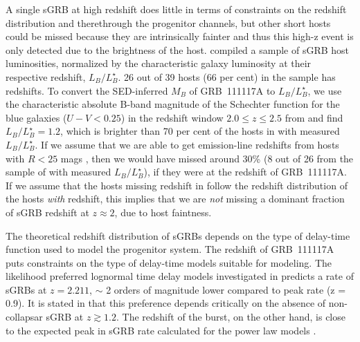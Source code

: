 \documentclass{aa}    %
\newcommand\todo[1]{\textbf{(#1)}}
\begin{document}
A single sGRB at high redshift does little in terms of constraints on the redshift distribution and therethrough the progenitor channels, but other short hosts could be missed because they are intrinsically fainter and thus this high-z event is only detected due to the brightness of the host. \citet{Berger2014} compiled a sample of sGRB host luminosities, normalized by the characteristic galaxy luminosity at their respective redshift, $L_B/L^{\star}_{B}$. 26 out of 39 hosts (66 per cent) in the sample has redshifts. To convert the SED-inferred $M_B$ of GRB~111117A to $L_B/L^{\star}_{B}$, we use the characteristic absolute B-band magnitude of the Schechter function for the blue galaxies ($U - V < 0.25$) in the redshift window $2.0 \leq z \leq 2.5$ from \citet{Marchesini2007} and find $L_B/L^{\star}_{B} = 1.2$, which is brighter than 70 per cent of the hosts in \citet{Berger2014} with measured $L_B/L^{\star}_{B}$. If we assume that we are able to get emission-line redshifts from hosts with $R < 25$ mags \citep{Kruhler2012}, then we would have missed around 30\% (8 out of 26 from the sample of \citealt{Berger2014} with measured $L_B/L^{\star}_{B}$), if they were at the redshift of GRB~111117A. If we assume that the hosts missing redshift in \citet{Berger2014} follow the redshift distribution of the hosts \textit{with} redshift, this implies that we are \textit{not} missing a dominant fraction of sGRB redshift at $z \approx 2$, due to host faintness. 

The theoretical redshift distribution of sGRBs depends on the type of delay-time function used to model the progenitor system. The redshift of GRB~111117A puts constraints on the type of delay-time models suitable for modeling. The likelihood preferred lognormal time delay models investigated in \citet{Wanderman2015} predicts a rate of sGRBs at $z = 2.211$, $\sim$ 2 orders of magnitude lower compared to peak rate (z = 0.9). It is stated in \citet{Wanderman2015} that this preference depends critically on the absence of non-collapsar sGRB at $z \gtrsim 1.2$. The redshift of the burst, on the other hand, is close to the expected peak in sGRB rate calculated for the power law models \citep{Behroozi2014, Wanderman2015}. 



\end{document}
